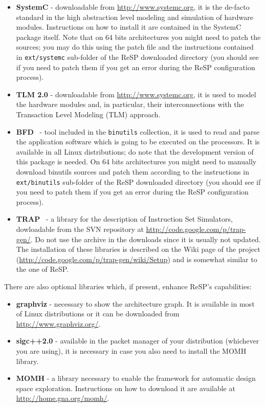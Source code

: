 \begin{itemize}
  \item \textbf{SystemC} - downloadable from \url{http://www.systemc.org}, it is the de-facto standard in the high abstraction level modeling and simulation of hardware modules. Instructions on how to install it are contained in the SystemC package itself. Note that on 64 bits architectures you might need to patch the sources; you may do this using the patch file and the instructions contained in \texttt{ext/systemc} sub-folder of the ReSP downloaded directory (you should see if you need to patch them if you get an error during the ReSP configuration process).
  \item \textbf{TLM 2.0} - downloadable from \url{http://www.systemc.org}, it is used to model the hardware modules and, in particular, their interconnections with the Transaction Level Modeling (TLM) approach.
  \item \textbf{BFD}~\cite{binary_binutils} - tool included in the \texttt{binutils} collection, it is used to read and parse the application software which is going to be executed on the processors. It is available in all Linux distributions; do note that the development version of this package is needed. On 64 bits architectures you might need to manually download binutils sources and patch them according to the instructions in \texttt{ext/binutils} sub-folder of the ReSP downloaded directory (you should see if you need to patch them if you get an error during the ReSP configuration process).
  \item \textbf{TRAP}~\cite{fossati_trap} - a library for the description of Instruction Set Simulators, dowloadable from the SVN repository at \url{http://code.google.com/p/trap-gen/}. Do not use the archive in the downloads since it is usually not updated. The installation of these libraries is described on the Wiki page of the project (\url{http://code.google.com/p/trap-gen/wiki/Setup}) and is somewhat similar to the one of ReSP.
\end{itemize}
\indent There are also optional libraries which, if present, enhance ReSP's capabilities:
\begin{itemize}
  \item \textbf{graphviz} - necessary to show the architecture graph. It is available in most of Linux distributions or it can be downloaded from \url{http://www.graphviz.org/}.
  \item \textbf{sigc++2.0} - available in the packet manager of your distribution (whichever you are using), it is necessary in case you also need to install the MOMH library.
  \item \textbf{MOMH} - a library necessary to enable the framework for automatic design space exploration. Instructions on how to download it are available at \url{http://home.gna.org/momh/}.
\end{itemize}


